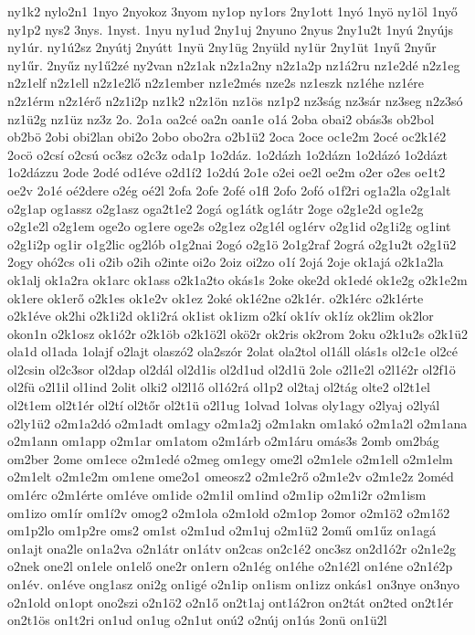 {ny1k2
nylo2n1
1nyo
2nyokoz
3nyom
ny1op
ny1ors
2ny1ott
1nyó
1nyö
ny1öl
1nyő
ny1p2
nys2
3nys.
1nyst.
1nyu
ny1ud
2ny1uj
2nyuno
2nyus
2ny1u2t
1nyú
2nyújs
ny1úr.
ny1ú2sz
2nyútj
2nyútt
1nyü
2ny1üg
2nyüld
ny1ür
2ny1üt
1nyű
2nyűr
ny1űr.
2nyűz
ny1ű2zé
ny2van
n2z1ak
n2z1a2ny
n2z1a2p
nz1á2ru
nz1e2dé
n2z1eg
n2z1elf
n2z1ell
n2z1e2lő
n2z1ember
nz1e2més
nze2s
nz1eszk
nz1éhe
nz1ére
n2z1érm
n2z1érő
n2z1i2p
nz1k2
n2z1ön
nz1ös
nz1p2
nz3ság
nz3sár
nz3seg
n2z3só
nz1ü2g
nz1üz
nz3z
2o.
2o1a
oa2cé
oa2n
oan1e
o1á
2oba
obai2
obás3s
ob2bol
ob2bö
2obi
obi2lan
obi2o
2obo
obo2ra
o2b1ü2
2oca
2oce
oc1e2m
2océ
oc2k1é2
2ocö
o2csí
o2csú
oc3sz
o2c3z
oda1p
1o2dáz.
1o2dázh
1o2dázn
1o2dázó
1o2dázt
1o2dázzu
2ode
2odé
od1éve
o2d1í2
1o2dú
2o1e
o2ei
oe2l
oe2m
o2er
o2es
oe1t2
oe2v
2o1é
oé2dere
o2ég
oé2l
2ofa
2ofe
2ofé
o1fl
2ofo
2ofó
o1f2ri
og1a2la
o2g1alt
o2g1ap
og1assz
o2g1asz
oga2t1e2
2ogá
og1átk
og1átr
2oge
o2g1e2d
og1e2g
o2g1e2l
o2g1em
oge2o
og1ere
oge2s
o2g1ez
o2g1él
og1érv
o2g1id
o2g1i2g
og1int
o2g1i2p
og1ir
o1g2lic
og2lób
o1g2nai
2ogó
o2g1ö
2o1g2raf
2ográ
o2g1u2t
o2g1ü2
2ogy
ohó2cs
o1i
o2ib
o2ih
o2inte
oi2o
2oiz
oi2zo
o1í
2ojá
2oje
ok1ajá
o2k1a2la
ok1alj
ok1a2ra
ok1arc
ok1ass
o2k1a2to
okás1s
2oke
oke2d
ok1edé
ok1e2g
o2k1e2m
ok1ere
ok1erő
o2k1es
ok1e2v
ok1ez
2oké
ok1é2ne
o2k1ér.
o2k1érc
o2k1érte
o2k1éve
ok2hi
o2k1i2d
ok1i2rá
ok1ist
ok1izm
o2kí
ok1ív
ok1íz
ok2lim
ok2lor
okon1n
o2k1osz
ok1ó2r
o2k1öb
o2k1ö2l
okö2r
ok2ris
ok2rom
2oku
o2k1u2s
o2k1ü2
ola1d
ol1ada
1olajf
o2lajt
olaszó2
ola2szór
2olat
ola2tol
ol1áll
olás1s
ol2c1e
ol2cé
ol2csin
ol2c3sor
ol2dap
ol2dál
ol2d1is
ol2d1ud
ol2d1ü
2ole
o2l1e2l
o2l1é2r
ol2f1ö
ol2fü
o2l1il
ol1ind
2olit
olki2
ol2l1ő
ol1ó2rá
ol1p2
ol2taj
ol2tág
olte2
ol2t1el
ol2t1em
ol2t1ér
ol2tí
ol2tőr
ol2t1ü
o2l1ug
1olvad
1olvas
oly1agy
o2lyaj
o2lyál
o2ly1ü2
o2m1a2dó
o2m1adt
om1agy
o2m1a2j
o2m1akn
om1akó
o2m1a2l
o2m1ana
o2m1ann
om1app
o2m1ar
om1atom
o2m1árb
o2m1áru
omás3s
2omb
om2bág
om2ber
2ome
om1ece
o2m1edé
o2meg
om1egy
ome2l
o2m1ele
o2m1ell
o2m1elm
o2m1elt
o2m1e2m
om1ene
ome2o1
omeosz2
o2m1e2rő
o2m1e2v
o2m1e2z
2oméd
om1érc
o2m1érte
om1éve
om1ide
o2m1il
om1ind
o2m1ip
o2m1i2r
o2m1ism
om1izo
om1ír
om1í2v
omog2
o2m1ola
o2m1old
o2m1op
2omor
o2m1ö2
o2m1ő2
om1p2lo
om1p2re
oms2
om1st
o2m1ud
o2m1uj
o2m1ü2
2omű
om1űz
on1agá
on1ajt
ona2le
on1a2va
o2n1átr
on1átv
on2cas
on2c1é2
onc3sz
on2d1ó2r
o2n1e2g
o2nek
one2l
on1ele
on1elő
one2r
on1ern
o2n1ég
on1éhe
o2n1é2l
on1éne
o2n1é2p
on1év.
on1éve
ong1asz
oni2g
on1igé
o2n1ip
on1ism
on1izz
onkás1
on3nye
on3nyo
o2n1old
on1opt
ono2szi
o2n1ö2
o2n1ő
on2t1aj
ont1á2ron
on2tát
on2ted
on2t1ér
on2t1ös
on1t2ri
on1ud
on1ug
o2n1ut
onú2
o2núj
on1ús
2onü
on1ü2l
}
